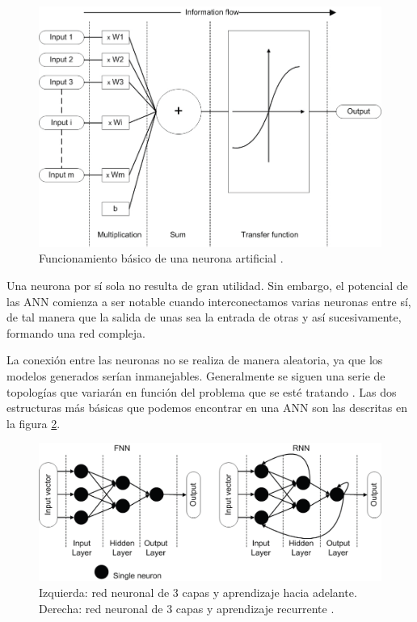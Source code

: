 \begin{figure}[h]
    \centering
    \includegraphics[width=1\textwidth]{img/neurona.png}
    \caption{Funcionamiento básico de una neurona artificial \cite{ann:intro}.}
    \label{fig:neurona}
\end{figure}

Una neurona por sí sola no resulta de gran utilidad. Sin embargo, el potencial de las ANN comienza a ser notable cuando interconectamos varias neuronas entre sí, de tal manera que la salida de unas sea la entrada de otras y así sucesivamente, formando una red compleja.

La conexión entre las neuronas no se realiza de manera aleatoria, ya que los modelos generados serían inmanejables. Generalmente se siguen una serie de topologías que variarán en función del problema que se esté tratando \cite{ann:intro, cnn:ieee}. Las dos estructuras más básicas que podemos encontrar en una ANN son las descritas en la figura \ref{fig:red_neuronal}.

\begin{figure}[h]
    \centering
    \includegraphics[width=1\textwidth]{img/red_neuronal.png}
    \caption{Izquierda: red neuronal de 3 capas y aprendizaje hacia adelante. Derecha: red neuronal de 3 capas y aprendizaje recurrente  \cite{ann:intro}.}
    \label{fig:red_neuronal}
\end{figure}

